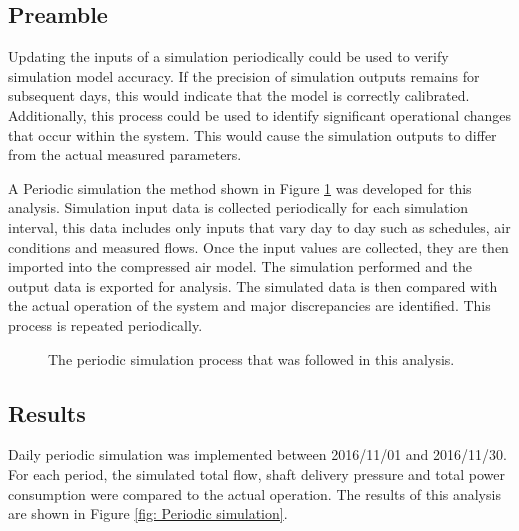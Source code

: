 	\subsection{Preamble}
	Updating the inputs of a simulation periodically could be used to verify simulation model accuracy. If the precision of simulation outputs remains for subsequent days, this would indicate that the model is correctly calibrated. Additionally, this process could be used to identify significant operational changes that occur within the system. This would cause the simulation outputs to differ from the actual measured parameters. 
	\par 
	A Periodic simulation the method shown in Figure \ref{fig: PeriodicProcess} was developed for this analysis. Simulation input data is collected periodically for each simulation interval, this data includes only inputs that vary day to day such as schedules, air conditions and  measured flows. Once the input values are collected, they are then imported into the compressed air model. The simulation performed and the output data is exported for analysis. The  simulated data is then compared with the actual operation of the system and major discrepancies are identified. This process is repeated periodically.
		\begin{figure}[h]
		\centering
		\caption{The periodic simulation process that was followed in this analysis.}
		\label{fig: PeriodicProcess}
		\end{figure}	
	     \subsection{Results}
	     Daily periodic simulation was implemented between 2016/11/01 and 2016/11/30. For each period, the simulated total flow, shaft delivery pressure and total power consumption were compared to the actual operation. The results of this analysis are shown in Figure \ref{fig: Periodic simulation}.
	     \par 
	     
